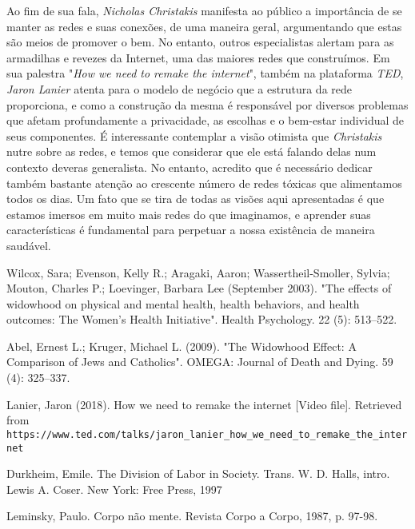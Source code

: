 \documentclass{homework}
\begin{document}
	\par
	Ao fim de sua fala, \textit{Nicholas Christakis} manifesta ao público a importância de se manter as redes e suas conexões, de uma maneira geral, argumentando que estas são meios de promover o bem. No entanto, outros especialistas alertam para as armadilhas e revezes da Internet, uma das maiores redes que construímos. Em sua palestra "\textit{How we need to remake the internet}", também na plataforma \textit{TED}, \textit{Jaron Lanier} atenta para o modelo de negócio que a estrutura da rede proporciona, e como a construção da mesma é responsável por diversos problemas que afetam profundamente a privacidade, as escolhas e o bem-estar individual de seus componentes\cite{lanier:18}. É interessante contemplar a visão otimista que \textit{Christakis} nutre sobre as redes, e temos que considerar que ele está falando delas num contexto deveras generalista. No entanto, acredito que é necessário dedicar também bastante atenção ao crescente número de redes tóxicas que alimentamos todos os dias. Um fato que se tira de todas as visões aqui apresentadas é que estamos imersos em muito mais redes do que imaginamos, e aprender suas características é fundamental para perpetuar a nossa existência de maneira saudável.%
	\par
	 
	
	
	 Wilcox, Sara; Evenson, Kelly R.; Aragaki, Aaron; Wassertheil-Smoller, Sylvia; Mouton, Charles P.; Loevinger, Barbara Lee (September 2003). "The effects of widowhood on physical and mental health, health behaviors, and health outcomes: The Women's Health Initiative". Health Psychology. 22 (5): 513–522. 

	 Abel, Ernest L.; Kruger, Michael L. (2009). "The Widowhood Effect: A Comparison of Jews and Catholics". OMEGA: Journal of Death and Dying. 59 (4): 325–337.
	
	 Lanier, Jaron (2018). How we need to remake the internet [Video file]. Retrieved from \texttt{https://www.ted.com/talks/jaron\_lanier\_how\_we\_need\_to\_remake\_the\_internet}
	
	 Durkheim, Emile. The Division of Labor in Society. Trans. W. D. Halls, intro. Lewis A. Coser. New York: Free Press, 1997
	
	 Leminsky, Paulo. Corpo não mente. Revista Corpo a Corpo, 1987, p. 97-98.
\end{document}
